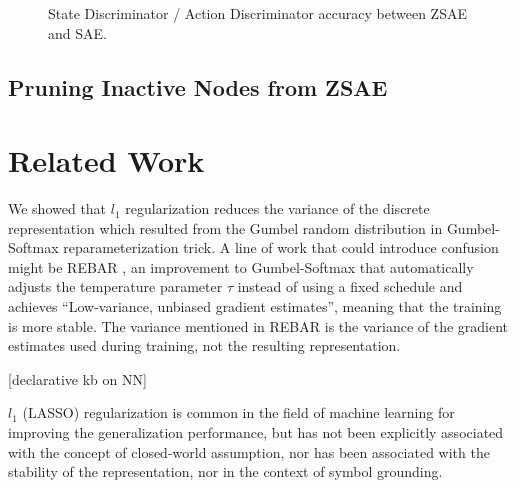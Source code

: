 \begin{figure}[htb]
 \vspace{1.5in}
 \caption{State Discriminator / Action Discriminator accuracy between ZSAE and SAE.}
 \label{fig:ama2-ad}
\end{figure}

\subsection{Pruning Inactive Nodes from ZSAE}

% 
% 

\section{Related Work}


We showed that $l_1$ regularization reduces the variance of the discrete
representation which resulted from the Gumbel random distribution
in Gumbel-Softmax reparameterization
trick.  A line of work that could introduce confusion might be REBAR
\cite{TuckerMMLS17}, an improvement to Gumbel-Softmax that automatically
adjusts the temperature parameter $\tau$ instead of using a fixed
schedule and achieves ``Low-variance, unbiased gradient estimates'',
meaning that the training is more stable. The variance mentioned in
REBAR is the variance of the gradient estimates used during training, not the
resulting representation.


[declarative kb on NN]




$l_1$ (LASSO) regularization is common in the field of machine learning for improving the
generalization performance,
but has not been explicitly associated with the concept of
closed-world assumption, nor has been associated with the stability of the representation,
nor in the context of symbol grounding.

